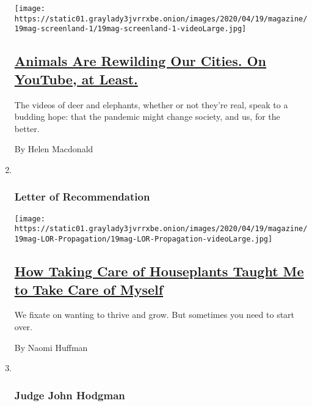 \begin{enumerate}
  \texttt{[image: https://static01.graylady3jvrrxbe.onion/images/2020/04/19/magazine/19mag-screenland-1/19mag-screenland-1-videoLarge.jpg]}

  \hypertarget{animals-are-rewilding-our-cities-on-youtube-at-least}{%
  \subsection{\texorpdfstring{\href{/2020/04/15/magazine/quarantine-animal-videos-coronavirus.html}{Animals
  Are Rewilding Our Cities. On YouTube, at
  Least.}}{Animals Are Rewilding Our Cities. On YouTube, at Least.}}\label{animals-are-rewilding-our-cities-on-youtube-at-least}}

  The videos of deer and elephants, whether or not they're real, speak
  to a budding hope: that the pandemic might change society, and us, for
  the better.

  By Helen Macdonald
\item ~
  \hypertarget{letter-of-recommendation}{%
  \subsubsection{Letter of
  Recommendation}\label{letter-of-recommendation}}

  \texttt{[image: https://static01.graylady3jvrrxbe.onion/images/2020/04/19/magazine/19mag-LOR-Propagation/19mag-LOR-Propagation-videoLarge.jpg]}

  \hypertarget{how-taking-care-of-houseplants-taught-me-to-take-care-of-myself}{%
  \subsection{\texorpdfstring{\href{/2020/04/16/magazine/how-taking-care-of-houseplants-taught-me-to-take-care-of-myself.html}{How
  Taking Care of Houseplants Taught Me to Take Care of
  Myself}}{How Taking Care of Houseplants Taught Me to Take Care of Myself}}\label{how-taking-care-of-houseplants-taught-me-to-take-care-of-myself}}

  We fixate on wanting to thrive and grow. But sometimes you need to
  start over.

  By Naomi Huffman
\item ~
  \hypertarget{judge-john-hodgman}{%
  \subsubsection{Judge John Hodgman}\label{judge-john-hodgman}}


\end{enumerate}
